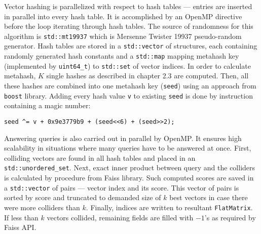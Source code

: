Vector hashing is parallelized with respect to hash tables --- entries are inserted in parallel
into every hash table. It is accomplished by an OpenMP directive before the loop iterating through
hash tables.
The source of randomness for this algorithm is \texttt{std::mt19937} which is Mersenne
Twister 19937 pseudo-random generator.
Hash tables are stored in a \texttt{std::vector} of structures, each containing
randomly generated hash constants and a \texttt{std::map} mapping
metahash key (implemented by \texttt{uint64\_t}) to \texttt{std::set} of vector indices.
In order to calculate metahash, $K$ single hashes as described in chapter 2.3 are computed.
Then, all these hashes are combined into one metahash key (\texttt{seed}) using an approach from
\texttt{boost} library. Adding every hash value \texttt{v} to existing \texttt{seed} is done
by instruction containing a magic number:
\begin{verbatim}
seed ^= v + 0x9e3779b9 + (seed<<6) + (seed>>2);
\end{verbatim}

Answering queries is also carried out in parallel by OpenMP. It ensures high scalability in situations
where many queries have to be answered at once. First, colliding vectors are found in all hash
tables and placed in an \texttt{std::unordered\_set}. Next, exact inner product between query and
the colliders is calculated by  procedure from Faiss library.
Such computed scores are saved in a \texttt{std::vector} of pairs --- vector index and its score.
This vector of pairs is sorted by score and truncated to demanded size of $k$ best vectors in case
there were more colliders than $k$. Finally, indices are written to resultant \texttt{FlatMatrix}.
If less than $k$ vectors collided, remaining fields are filled with $-1$'s as required by
Faiss API.
